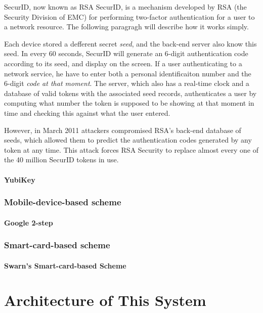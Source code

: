 \begin{CJK}{Bg5}{bsmi}
SecurID, now known as RSA SecurID, is a mechanism developed by RSA (the Security Division of EMC) for performing two-factor authentication for a user to a network resource. The following paragragh will describe how it works simply.

Each device stored a defferent secret \emph{seed}, and the back-end server also know this seed. In every 60 seconds, SecurID will generate an 6-digit authentication code according to its seed, and display on the screen. If a user authenticating to a network service, he have to enter both a personal identificaiton number and the 6-digit \emph{code at that moment}. The server, which also has a real-time clock and a database of valid tokens with the associated seed records, authenticates a user by computing what number the token is supposed to be showing at that moment in time and checking this against what the user entered.

However, in March 2011 attackers compromised RSA’s back-end database of seeds, which allowed them to predict the authentication codes generated by any token at any time. This attack forces RSA Security to replace almost every one of the 40 million SecurID tokens in use.

\subsubsection{YubiKey}

\subsection{Mobile-device-based scheme}

\subsubsection{Google 2-step}

\subsection{Smart-card-based scheme}

\subsubsection{Swarn's Smart-card-based Scheme}

\chapter{Architecture of This System}


\end{CJK}
